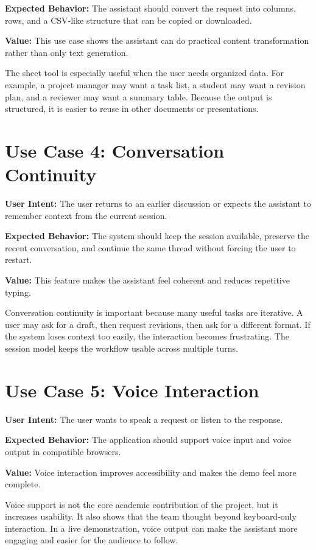 \documentclass[11pt,oneside]{report}
\begin{document}
\textbf{Expected Behavior:} The assistant should convert the request into columns, rows, and a CSV-like structure that can be copied or downloaded.

\textbf{Value:} This use case shows the assistant can do practical content transformation rather than only text generation.

The sheet tool is especially useful when the user needs organized data. For example, a project manager may want a task list, a student may want a revision plan, and a reviewer may want a summary table. Because the output is structured, it is easier to reuse in other documents or presentations.

\section{Use Case 4: Conversation Continuity}
\textbf{User Intent:} The user returns to an earlier discussion or expects the assistant to remember context from the current session.

\textbf{Expected Behavior:} The system should keep the session available, preserve the recent conversation, and continue the same thread without forcing the user to restart.

\textbf{Value:} This feature makes the assistant feel coherent and reduces repetitive typing.

Conversation continuity is important because many useful tasks are iterative. A user may ask for a draft, then request revisions, then ask for a different format. If the system loses context too easily, the interaction becomes frustrating. The session model keeps the workflow usable across multiple turns.

\section{Use Case 5: Voice Interaction}
\textbf{User Intent:} The user wants to speak a request or listen to the response.

\textbf{Expected Behavior:} The application should support voice input and voice output in compatible browsers.

\textbf{Value:} Voice interaction improves accessibility and makes the demo feel more complete.

Voice support is not the core academic contribution of the project, but it increases usability. It also shows that the team thought beyond keyboard-only interaction. In a live demonstration, voice output can make the assistant more engaging and easier for the audience to follow.
\end{document}
